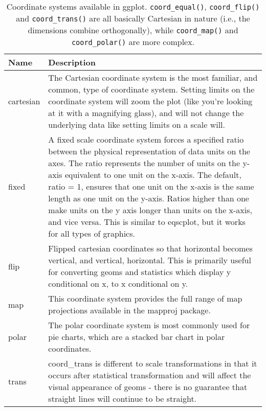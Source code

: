 \begin{table}[ht]
\centering
\begin{tabular}{ll}
  \hline
Name & Description \\ 
  \hline
cartesian & The Cartesian coordinate system is the most familiar, and common, type of coordinate system. Setting limits on the coordinate system will zoom the plot (like you're looking at it with a magnifying glass), and will not change the underlying data like setting limits on a scale will. \\ 
  fixed & A fixed scale coordinate system forces a specified ratio between the physical representation of data units on the axes. The ratio represents the number of units on the y-axis equivalent to one unit on the x-axis. The default, ratio = 1, ensures that one unit on the x-axis is the same length as one unit on the y-axis. Ratios higher than one make units on the y axis longer than units on the x-axis, and vice versa. This is similar to eqscplot, but it works for all types of graphics. \\ 
  flip & Flipped cartesian coordinates so that horizontal becomes vertical, and vertical, horizontal. This is primarily useful for converting geoms and statistics which display y conditional on x, to x conditional on y. \\ 
  map & This coordinate system provides the full range of map projections available in the mapproj package. \\ 
  polar & The polar coordinate system is most commonly used for pie charts, which are a stacked bar chart in polar coordinates. \\ 
  trans & coord\_trans is different to scale transformations in that it occurs after statistical transformation and will affect the visual appearance of geoms - there is no guarantee that straight lines will continue to be straight. \\ 
   \hline
\end{tabular}
\caption{Coordinate systems available in ggplot. 
\texttt{coord_equal()}, \texttt{coord_flip()} and \texttt{coord_trans()} 
are all basically Cartesian in nature (i.e., the dimensions combine orthogonally), 
while \texttt{coord_map()} and \texttt{coord_polar()} are more complex.} 
\label{coord}
\end{table}
